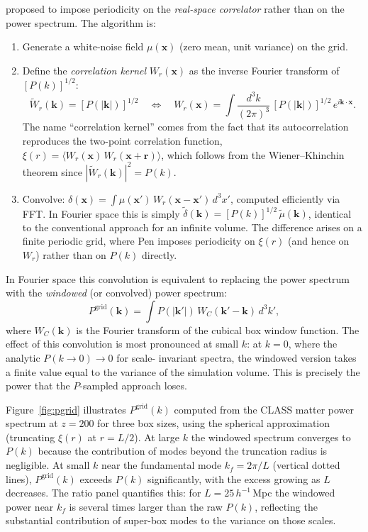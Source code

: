\documentclass[12pt]{article}
\begin{document}
\citet{Pen1997} proposed to impose periodicity on the \emph{real-space
correlator} rather than on the power spectrum.  The algorithm is:
%
\begin{enumerate}
  \item Generate a white-noise field $\mu(\mathbf{x})$ (zero mean, unit
        variance) on the grid.
  \item Define the \emph{correlation kernel} $W_r(\mathbf{x})$ as the
        inverse Fourier transform of $[P(k)]^{1/2}$:
        \begin{equation}
          \tilde{W}_r(\mathbf{k}) = [P(|\mathbf{k}|)]^{1/2}
          \quad \Longleftrightarrow \quad
          W_r(\mathbf{x}) = \int \frac{d^3k}{(2\pi)^3}\,
          [P(|\mathbf{k}|)]^{1/2}\,e^{i\mathbf{k}\cdot\mathbf{x}}.
          \label{eq:corrkernel}
        \end{equation}
        The name ``correlation kernel'' comes from the fact that its
        autocorrelation reproduces the two-point correlation function,
        $\xi(r) = \langle W_r(\mathbf{x})\,W_r(\mathbf{x}+\mathbf{r})\rangle$,
        which follows from the Wiener--Khinchin theorem since
        $|\tilde{W}_r(\mathbf{k})|^2 = P(k)$.
  \item Convolve: $\delta(\mathbf{x}) = \int \mu(\mathbf{x}')\,
        W_r(\mathbf{x}-\mathbf{x}')\,d^3x'$,
        computed efficiently via FFT.  In Fourier space this is simply
        $\tilde{\delta}(\mathbf{k}) = [P(k)]^{1/2}\,\tilde{\mu}(\mathbf{k})$,
        identical to the conventional approach for an infinite volume.
        The difference arises on a finite periodic grid, where Pen
        imposes periodicity on $\xi(r)$ (and hence on $W_r$) rather
        than on $P(k)$ directly.
\end{enumerate}
%
In Fourier space this convolution is equivalent to replacing the power
spectrum with the \emph{windowed} (or convolved) power spectrum:
\begin{equation}
  P^\mathrm{grid}(\mathbf{k}) = \int P(|\mathbf{k}'|)\,
  W_C(\mathbf{k}'-\mathbf{k})\,d^3k',
  \label{eq:pgrid}
\end{equation}
where $W_C(\mathbf{k})$ is the Fourier transform of the cubical box
window function.  The effect of this convolution is most pronounced at
small $k$: at $k=0$, where the analytic $P(k\to 0) \to 0$ for scale-
invariant spectra, the windowed version takes a finite value equal to
the variance of the simulation volume.  This is precisely the power that
the $P$-sampled approach loses.

Figure~\ref{fig:pgrid} illustrates $P^\mathrm{grid}(k)$ computed from
the CLASS matter power spectrum at $z=200$ for three box sizes, using
the spherical approximation (truncating $\xi(r)$ at $r = L/2$).  At
large $k$ the windowed spectrum converges to $P(k)$ because the
contribution of modes beyond the truncation radius is negligible.  At
small $k$ near the fundamental mode $k_f = 2\pi/L$ (vertical dotted
lines), $P^\mathrm{grid}(k)$ exceeds $P(k)$ significantly, with the
excess growing as $L$ decreases.  The ratio panel quantifies this: for
$L = 25\,h^{-1}$\,Mpc the windowed power near $k_f$ is several times
larger than the raw $P(k)$, reflecting the substantial contribution
of super-box modes to the variance on those scales.
\end{document}
